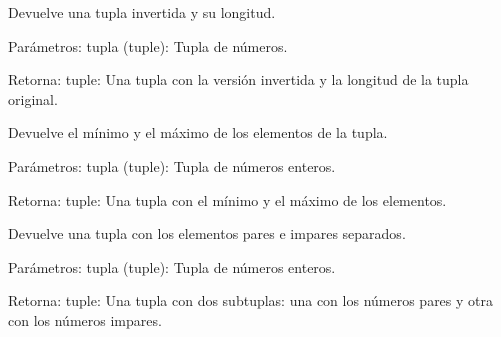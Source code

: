 \documentclass[letterpaper,10pt,spanish]{sphinxmanual}
\begin{document}

\begin{fulllineitems}
\label{\detokenize{pr7:pr7.2.invertir_y_longitud}}
\pysigstartsignatures
{}
\pysigstopsignatures
\sphinxAtStartPar
Devuelve una tupla invertida y su longitud.

\sphinxAtStartPar
Parámetros:
tupla (tuple): Tupla de números.

\sphinxAtStartPar
Retorna:
tuple: Una tupla con la versión invertida y la longitud de la tupla original.

\end{fulllineitems}


\begin{fulllineitems}
\label{\detokenize{pr7:pr7.2.min_y_max}}
\pysigstartsignatures
{}
\pysigstopsignatures
\sphinxAtStartPar
Devuelve el mínimo y el máximo de los elementos de la tupla.

\sphinxAtStartPar
Parámetros:
tupla (tuple): Tupla de números enteros.

\sphinxAtStartPar
Retorna:
tuple: Una tupla con el mínimo y el máximo de los elementos.

\end{fulllineitems}


\begin{fulllineitems}
\label{\detokenize{pr7:pr7.2.pares_e_impares}}
\pysigstartsignatures
{}
\pysigstopsignatures
\sphinxAtStartPar
Devuelve una tupla con los elementos pares e impares separados.

\sphinxAtStartPar
Parámetros:
tupla (tuple): Tupla de números enteros.

\sphinxAtStartPar
Retorna:
tuple: Una tupla con dos sub\sphinxhyphen{}tuplas: una con los números pares y otra con los números impares.

\end{fulllineitems}
\end{document}
